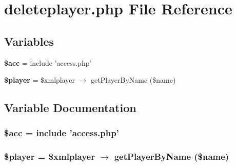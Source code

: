 \section{deleteplayer.php File Reference}
\label{deleteplayer_8php}


\subsection*{Variables}
\begin{CompactItemize}
\item 
{\bf \$acc} = include 'access.php'
\item 
{\bf \$player} = \$xmlplayer $\rightarrow$ get\-Player\-By\-Name (\$name)
\end{CompactItemize}


\subsection{Variable Documentation}
\subsubsection{\setlength{\rightskip}{0pt plus 5cm}\$acc = include 'access.php'}\label{deleteplayer_8php_542926c588a05eb69553d79c83cf73da}


\subsubsection{\setlength{\rightskip}{0pt plus 5cm}\$player = \$xmlplayer $\rightarrow$ get\-Player\-By\-Name (\$name)}\label{deleteplayer_8php_b3e8b8a040d140eeafa4907e25af9360}



